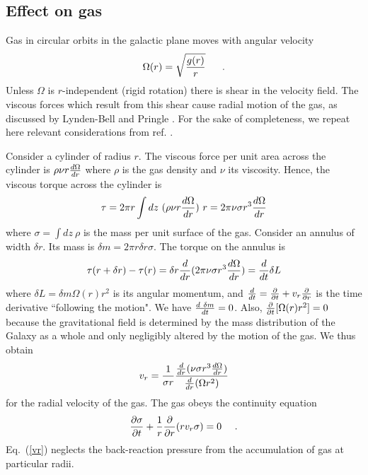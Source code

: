 \documentclass[aps,prd,preprint,tightenlines,floatfix,showpacs,groupedaddress]{revtex4}
\begin{document}
\subsection{Effect on gas}

Gas in circular orbits in the galactic plane moves with 
angular velocity
\begin{equation}
\Omega(r) = \sqrt{g(r) \over r}~~~~\ .
\label{angvel}
\end{equation}
Unless $\Omega$ is $r$-independent (rigid rotation) there 
is shear in the velocity field.  The viscous forces which 
result from this shear cause radial motion of the gas, as 
discussed by Lynden-Bell and Pringle \cite{LBP}.  For the 
sake of completeness, we repeat here relevant considerations 
from ref. \cite{LBP}.

Consider a cylinder of radius $r$.  The viscous force per unit 
area across the cylinder is $\rho \nu r {d \Omega \over dr}$
where $\rho$ is the gas density and $\nu$ its viscosity.  Hence, 
the viscous torque across the cylinder is 
\begin{equation}
\tau = 2 \pi r \int dz~(\rho \nu r {d \Omega \over dr})~r
= 2 \pi \nu \sigma r^3 {d \Omega \over dr}
\label{tor}
\end{equation}
where $\sigma = \int dz~\rho$ is the mass per unit surface 
of the gas.  Consider an annulus of width $\delta r$.  Its 
mass is $\delta m = 2 \pi r \delta r \sigma$.  The torque 
on the annulus is 
\begin{equation}
\tau(r + \delta r) - \tau(r) = 
\delta r {d \over dr}(2 \pi \nu \sigma r^3 {d \Omega \over dr})
= {d \over dt} \delta L
\label{anntor}
\end{equation}
where $\delta L = \delta m \Omega(r) r^2$ is its angular 
momentum, and ${d \over dt} = {\partial \over \partial t} + 
v_r {\partial \over \partial r}$ is the time derivative 
``following the motion".  We have ${d~\delta m \over dt} = 0$.  
Also, ${\partial \over \partial t} [\Omega(r) r^2] = 0$ 
because the gravitational field is determined by the 
mass distribution of the Galaxy as a whole and only 
negligibly altered by the motion of the gas.  We thus 
obtain
\begin{equation}
v_r = {1 \over \sigma r}
{{d \over dr} (\nu \sigma r^3 {d \Omega \over dr}) \over 
{d \over dr} (\Omega r^2)}
\label{vr}
\end{equation}
for the radial velocity of the gas.  The gas obeys the 
continuity equation
\begin{equation}
{\partial \sigma \over \partial t} + 
{1 \over r} {\partial \over \partial r} (r v_r \sigma) = 0~~~\ .
\label{con}
\end{equation}
Eq.~(\ref{vr}) neglects the back-reaction pressure from 
the accumulation of gas at particular radii.
\end{document}
